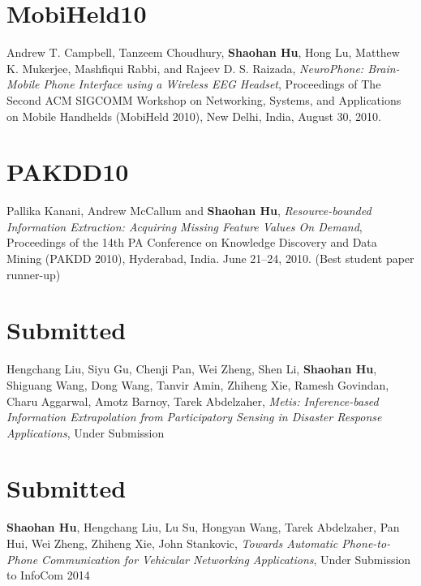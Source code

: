 \section{\sc MobiHeld10}
Andrew T. Campbell, Tanzeem Choudhury, \textbf{Shaohan Hu}, Hong Lu,
Matthew K. Mukerjee, Mashfiqui Rabbi, and Rajeev D. S. Raizada,
\emph{NeuroPhone: Brain-Mobile Phone Interface using a Wireless EEG
  Headset}, \textsf{Proceedings of The Second ACM SIGCOMM Workshop on
  Networking, Systems, and Applications on Mobile Handhelds (MobiHeld
  2010)}, New Delhi, India, August 30, 2010.

\section{\sc PAKDD10}
Pallika Kanani, Andrew McCallum and \textbf{Shaohan Hu},
\emph{Resource-bounded Information Extraction: Acquiring Missing
  Feature Values On Demand}, \textsf{Proceedings of the 14th PA
  Conference on Knowledge Discovery and Data Mining (PAKDD 2010)},
Hyderabad, India. June 21--24, 2010. (Best student paper runner-up)


\section{\sc Submitted}
Hengchang Liu, Siyu Gu, Chenji Pan, Wei Zheng, Shen Li,
\textbf{Shaohan Hu}, Shiguang Wang, Dong Wang, Tanvir Amin, Zhiheng
Xie, Ramesh Govindan, Charu Aggarwal, Amotz Barnoy, Tarek Abdelzaher,
\emph{Metis: Inference-based Information Extrapolation from
  Participatory Sensing in Disaster Response Applications},
\textsf{Under Submission} %

\section{\sc Submitted}
\textbf{Shaohan Hu}, Hengchang Liu, Lu Su, Hongyan Wang, Tarek
Abdelzaher, Pan Hui, Wei Zheng, Zhiheng Xie, John Stankovic,
\emph{Towards Automatic Phone-to-Phone Communication for Vehicular
  Networking Applications}, \textsf{Under Submission to InfoCom 2014}
